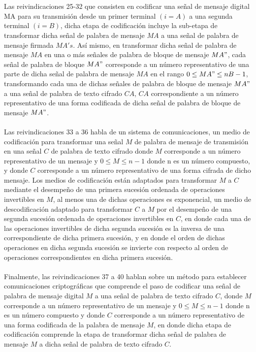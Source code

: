 \documentclass[12pt, a4paper]{article}
\begin{document}
	\\
	\\Las reivindicaciones 25-32 que consisten en codificar una señal de mensaje digital MA para su transmisión desde un primer terminal $(i = A)$ a una segunda terminal $(i = B)$, dicha etapa de codificación incluye la sub-etapa de transformar dicha señal de palabra de mensaje $MA$ a una señal de palabra de mensaje firmada $MA's$. Así mismo, en transformar dicha señal de palabra de mensaje $MA$ en una o más señales de palabra de bloque de mensaje $MA"$, cada señal de palabra de bloque $MA"$ corresponde a un número representativo de una parte de dicha señal de palabra de mensaje $MA$ en el rango $0 \leq MA"\leq nB -1$, transformando cada una de dichas señales de palabra de bloque de mensaje $MA"$ a una señal de palabra de texto cifrado $CA$, $CA$ correspondiente a un número representativo de una forma codificada de dicha señal de palabra de bloque de mensaje $MA"$.
	\\
	\\Las reivindicaciones 33 a 36 habla de un sistema de comunicaciones, un medio de codificación para transformar una señal $M$ de palabra de mensaje de transmisión en una señal $C$ de palabra de texto cifrado donde $M$ corresponde a un número representativo de un mensaje y $0 \leq M \leq n-1$ donde n es un número compuesto, y donde $C$ corresponde a un número representativo de una forma cifrada de dicho mensaje. Los medios de codificación están adaptados para transformar $M$ a $C$ mediante el desempeño de una primera sucesión ordenada de operaciones invertibles en $M$, al menos una de dichas operaciones es exponencial, un medio de descodificación adaptado para transformar $C$ a $M$ por el desempeño de una segunda sucesión ordenada de operaciones invertibles en $C$, en donde cada una de las operaciones invertibles de dicha segunda sucesión es la inversa de una correspondiente de dicha primera sucesión, y en donde el orden de dichas operaciones en dicha segunda sucesión se invierte con respecto al orden de operaciones correspondientes en dicha primera sucesión.
	\\
	\\Finalmente, las reivindicaciones 37 a 40 hablan sobre un método para establecer comunicaciones criptográficas que comprende el paso de codificar una señal de palabra de mensaje digital $M$ a una señal de palabra de texto cifrado $C$, donde $M$ corresponde a un número representativo de un mensaje y $0 \leq M \leq n-1$ donde n es un número compuesto y donde $C$ corresponde a un número representativo de una forma codificada de la palabra de mensaje $M$, en donde dicha etapa de codificación comprende la etapa de transformar dicha señal de palabra de mensaje $M$ a dicha señal de palabra de texto cifrado $C$.
\end{document}
